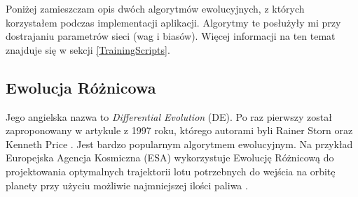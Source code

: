 Poniżej zamieszczam opis dwóch algorytmów ewolucyjnych, z których korzystałem podczas implementacji aplikacji. Algorytmy te posłużyły mi przy dostrajaniu parametrów sieci (wag i biasów). Więcej informacji na ten temat znajduje się w sekcji \ref{TrainingScripts}.

\subsection{Ewolucja Różnicowa}
Jego angielska nazwa to \textit{Differential Evolution} (DE). Po raz pierwszy został zaproponowany w artykule z 1997 roku, którego autorami byli Rainer Storn oraz Kenneth Price \cite{de:firstArticle}. Jest bardzo popularnym algorytmem ewolucyjnym. Na przykład Europejska Agencja Kosmiczna (ESA) wykorzystuje Ewolucję Różnicową do projektowania optymalnych trajektorii lotu potrzebnych do wejścia na orbitę planety przy użyciu możliwie najmniejszej ilości paliwa \cite{de:esaArticle}.

